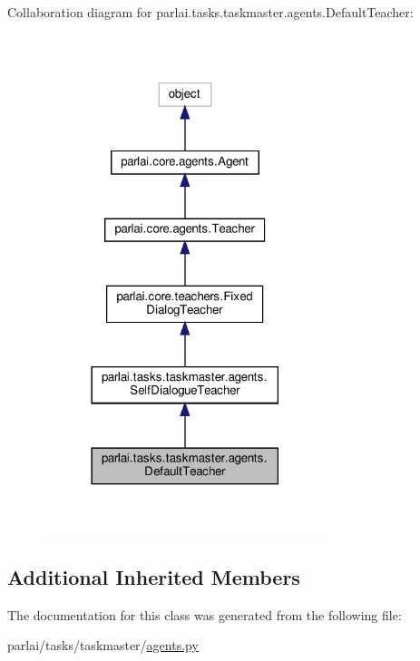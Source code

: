 Collaboration diagram for parlai.\+tasks.\+taskmaster.\+agents.\+Default\+Teacher\+:
\nopagebreak
\begin{figure}[H]
\begin{center}
\leavevmode
\includegraphics[width=234pt]{classparlai_1_1tasks_1_1taskmaster_1_1agents_1_1DefaultTeacher__coll__graph}
\end{center}
\end{figure}
\subsection*{Additional Inherited Members}


The documentation for this class was generated from the following file\+:\begin{DoxyCompactItemize}
\item 
parlai/tasks/taskmaster/\hyperlink{parlai_2tasks_2taskmaster_2agents_8py}{agents.\+py}\end{DoxyCompactItemize}
